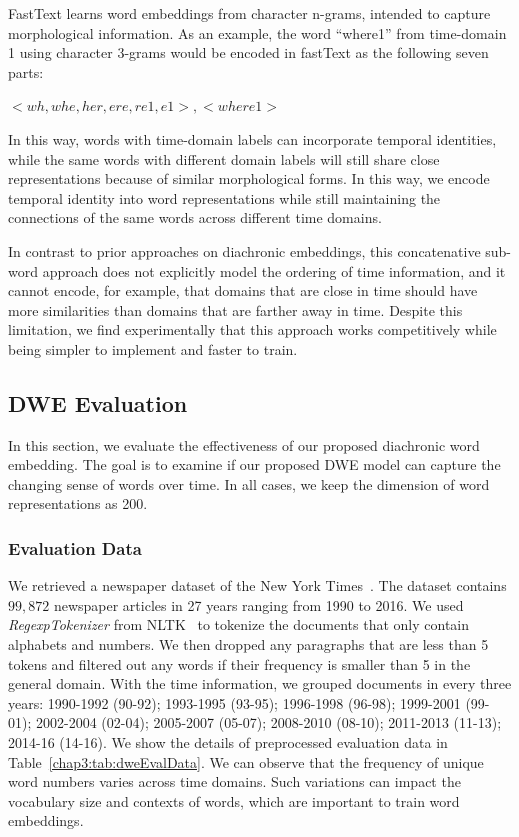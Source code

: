 FastText learns word embeddings from character n-grams, intended to capture morphological information. As an example, the word ``where1'' from time-domain 1 using character 3-grams would be encoded in fastText as the following seven parts:
\begin{center}
    $<wh, whe, her, ere, re1, e1>, <where1>$
\end{center}

In this way, words with time-domain labels can incorporate temporal identities, while the same words with different domain labels will still share close representations because of similar morphological forms. In this way, we encode temporal identity into word representations while still maintaining the connections of the same words across different time domains. 

In contrast to prior approaches on diachronic embeddings, this concatenative sub-word approach does not explicitly model the ordering of time information, and it cannot encode, for example, that domains that are close in time should have more similarities than domains that are farther away in time.
Despite this limitation, we find experimentally that this approach works competitively while being simpler to implement and faster to train.

\subsection{DWE Evaluation}
\label{chap3:subsec:dweEval}

In this section, we evaluate the effectiveness of our proposed diachronic word embedding.
The goal is to examine if our proposed DWE model can capture the changing sense of words over time.
In all cases, we keep the dimension of word representations as 200.

\subsubsection{Evaluation Data}
We retrieved a newspaper dataset of the New York Times~\cite{yao2018dynamic}.
The dataset contains $99,872$ newspaper articles in 27 years ranging from 1990 to 2016.
We used \textit{RegexpTokenizer} from NLTK~\cite{bird2004nltk} to tokenize the documents that only contain alphabets and numbers.
We then dropped any paragraphs that are less than 5 tokens and filtered out any words if their frequency is smaller than 5 in the general domain.
With the time information, we grouped documents in every three years: 1990-1992 (90-92); 1993-1995 (93-95); 1996-1998 (96-98); 1999-2001 (99-01); 2002-2004 (02-04); 2005-2007 (05-07); 2008-2010 (08-10); 2011-2013 (11-13); 2014-16 (14-16). 
We show the details of preprocessed evaluation data in Table~\ref{chap3:tab:dweEvalData}.
We can observe that the frequency of unique word numbers varies across time domains. 
Such variations can impact the vocabulary size and contexts of words, which are important to train word embeddings.

